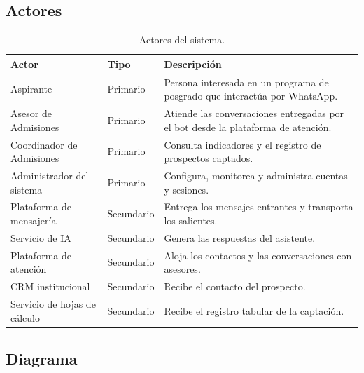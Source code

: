\documentclass[12pt,a4paper]{report}
\newcommand{\tablacompacta}{\setstretch{1.1}\small}
\newcommand{\cabecera}[1]{\rowcolor{filacabecera}#1}
\begin{document}
\subsection{Actores}

\begin{table}[H]
    \centering
    \tablacompacta
    \begin{tabularx}{\textwidth}{p{3.4cm}p{2.0cm}X}
        \toprule
        \cabecera{\textbf{Actor}} & \textbf{Tipo} & \textbf{Descripción} \\
        \midrule
        Aspirante & Primario & Persona interesada en un programa de posgrado que interactúa por WhatsApp. \\
        Asesor de Admisiones & Primario & Atiende las conversaciones entregadas por el bot desde la plataforma de atención. \\
        Coordinador de Admisiones & Primario & Consulta indicadores y el registro de prospectos captados. \\
        Administrador del sistema & Primario & Configura, monitorea y administra cuentas y sesiones. \\
        Plataforma de mensajería & Secundario & Entrega los mensajes entrantes y transporta los salientes. \\
        Servicio de IA & Secundario & Genera las respuestas del asistente. \\
        Plataforma de atención & Secundario & Aloja los contactos y las conversaciones con asesores. \\
        CRM institucional & Secundario & Recibe el contacto del prospecto. \\
        Servicio de hojas de cálculo & Secundario & Recibe el registro tabular de la captación. \\
        \bottomrule
    \end{tabularx}
    \caption{Actores del sistema.}
\end{table}

\subsection{Diagrama}
\end{document}
